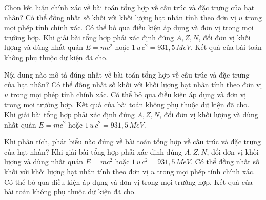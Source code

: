 \begin{ex}
Chọn kết luận chính xác về bài toán tổng hợp về cấu trúc và đặc trưng của hạt nhân?
\choice
{Có thể đồng nhất số khối với khối lượng hạt nhân tính theo đơn vị $u$ trong mọi phép tính chính xác.}
{Có thể bỏ qua điều kiện áp dụng và đơn vị trong mọi trường hợp.}
{\True Khi giải bài tổng hợp phải xác định đúng $A,Z,N$, đổi đơn vị khối lượng và dùng nhất quán $E=mc^2$ hoặc $1\,u\,c^2=931,5\,MeV$.}
{Kết quả của bài toán không phụ thuộc dữ kiện đã cho.}
\end{ex}

\begin{ex}
Nội dung nào mô tả đúng nhất về bài toán tổng hợp về cấu trúc và đặc trưng của hạt nhân?
\choice
{Có thể đồng nhất số khối với khối lượng hạt nhân tính theo đơn vị $u$ trong mọi phép tính chính xác.}
{Có thể bỏ qua điều kiện áp dụng và đơn vị trong mọi trường hợp.}
{Kết quả của bài toán không phụ thuộc dữ kiện đã cho.}
{\True Khi giải bài tổng hợp phải xác định đúng $A,Z,N$, đổi đơn vị khối lượng và dùng nhất quán $E=mc^2$ hoặc $1\,u\,c^2=931,5\,MeV$.}
\end{ex}

\begin{ex}
Khi phân tích, phát biểu nào đúng về bài toán tổng hợp về cấu trúc và đặc trưng của hạt nhân?
\choice
{\True Khi giải bài tổng hợp phải xác định đúng $A,Z,N$, đổi đơn vị khối lượng và dùng nhất quán $E=mc^2$ hoặc $1\,u\,c^2=931,5\,MeV$.}
{Có thể đồng nhất số khối với khối lượng hạt nhân tính theo đơn vị $u$ trong mọi phép tính chính xác.}
{Có thể bỏ qua điều kiện áp dụng và đơn vị trong mọi trường hợp.}
{Kết quả của bài toán không phụ thuộc dữ kiện đã cho.}
\end{ex}

